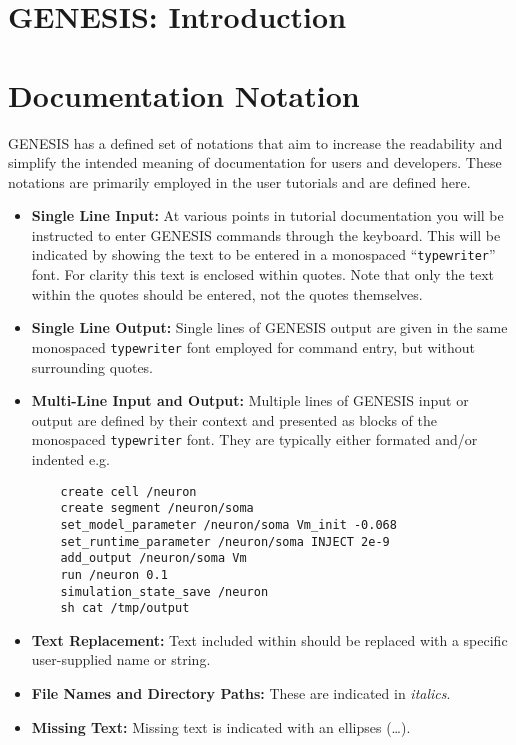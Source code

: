 \documentclass[12pt]{article}
\begin{document}
\section*{GENESIS: Introduction}

\section*{Documentation Notation}

GENESIS has a defined set of notations that aim to increase the readability and simplify the intended meaning of documentation for users and developers. These notations are primarily employed in the user tutorials and are defined here.

\begin{itemize}

\item {\bf Single Line Input:} At various points in tutorial documentation you will be instructed to enter GENESIS commands through the keyboard. This will be indicated by showing the text to be entered in a monospaced ``{\tt typewriter}'' font. For clarity this text is enclosed within quotes. Note that only the text within the quotes should be entered, not the quotes themselves.

\item {\bf Single Line Output:} Single lines of GENESIS output are given in the same monospaced {\tt typewriter} font employed for command entry, but without surrounding quotes.

\item {\bf Multi-Line Input and Output:} Multiple lines of GENESIS input or output are defined by their context and presented as blocks of the monospaced {\tt typewriter} font. They are typically either formated and/or indented e.g.

\begin{verbatim}
    create cell /neuron
    create segment /neuron/soma
    set_model_parameter /neuron/soma Vm_init -0.068
    set_runtime_parameter /neuron/soma INJECT 2e-9
    add_output /neuron/soma Vm
    run /neuron 0.1
    simulation_state_save /neuron
    sh cat /tmp/output
\end{verbatim}

\item {\bf Text Replacement:} Text included within {\tt <angle brackets>} should be replaced with a specific user-supplied name or string.

\item {\bf File Names and Directory Paths:} These are indicated in {\it italics}.

\item {\bf Missing Text:} Missing text is indicated with an ellipses (\ldots).

\end{itemize}
\end{document}
